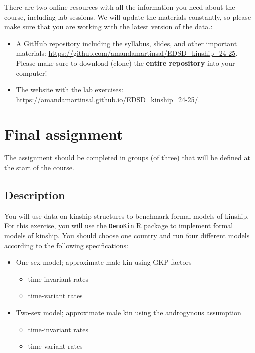 \documentclass{article}
\begin{document}
There are two online resources with all the information you need about the course, including lab sessions. We will update the materials constantly, so please make sure that you are working with the latest version of the data.:

\begin{itemize}
    \item A GitHub repository including the syllabus, slides, and other important materials: \url{https://github.com/amandamartinsal/EDSD_kinship_24-25}. Please make sure to download (clone) the \textbf{entire repository} into your computer!
    \item The website with the lab exercises: \url{https://amandamartinsal.github.io/EDSD_kinship_24-25/}.
\end{itemize}

\section{Final assignment}
\label{sec:assignment}

The assignment should be completed in groups (of three) that will be defined at the start of the course.

\subsection{Description}

You will use data on kinship structures to benchmark formal models of kinship.
For this exercise, you will use the \texttt{DemoKin} R package to implement formal models of kinship. 
You should choose one country and run four different models according to the following specifications:

    \begin{itemize}
        \item One-sex model; approximate male kin using GKP factors
       \begin{itemize}
           \item time-invariant rates
           \item time-variant rates
       \end{itemize}  
        
        \item Two-sex model; approximate male kin using the androgynous assumption
         \begin{itemize}
           \item time-invariant rates
           \item time-variant rates
             \end{itemize}  
     \end{itemize}
\end{document}
